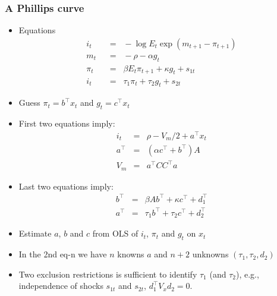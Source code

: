 \documentclass[handout]{beamer}
\begin{document}
\begin{frame}
\frametitle{A Phillips curve}
\begin{footnotesize}
\begin{itemize} %
\item Equations %
\begin{align*}
    i_t &\;\;=\;\; - \log E_t \exp(m_{t+1}-\pi_{t+1}) \tag{Euler equation} \\
        m_t &\;\;=\;\;  - \rho - \alpha g_t  \tag{Pricing kernel}\\
            \pi_t &\;\;=\;\;  \beta E_t \pi_{t+1} + \kappa g_t + s_{1t}  \tag{Phillips curve} \\
    i_t &\;\;=\;\;  \tau_1 \pi_{t} + \tau_2 g_t+ s_{2t} \tag{Taylor rule}
\end{align*}
\pause
\item Guess $\pi_t=b^\top x_t$ and $g_t = c^{\top} x_t$
\item First two equations imply:
\begin{eqnarray*}
   i_t &=&  \rho - V_m/2  + a^\top x_t \\
    a^\top &=& (\alpha c^\top + b^\top)  A  \\
    V_m     &=& a^\top C C^\top a
\end{eqnarray*}
\item Last two equations imply:
\begin{eqnarray*}
           b^\top &=& \beta  A  b^\top + \kappa c^\top + d_1^\top \\
                     a^\top &=& \tau_1 b^\top + \tau_2 c^\top + d_2^\top
\end{eqnarray*}
\item Estimate $a$, $b$ and $c$ from OLS of $i_t$, $\pi_t$ and $g_t$ on $x_t$
 \item In the 2nd eq-n we have $n$ knowns $a$ and $n+2$ unknowns  $(\tau_1, \tau_2,  d_2)$
 \item Two exclusion restrictions is sufficient to identify $\tau_1$ (and $\tau_2$), e.g., independence of shocks $s_{1t}$ and $s_{2t}$, $d_1^{\top}V_x d_2=0.$
\end{itemize}
\end{footnotesize}
\end{frame}
\end{document}
